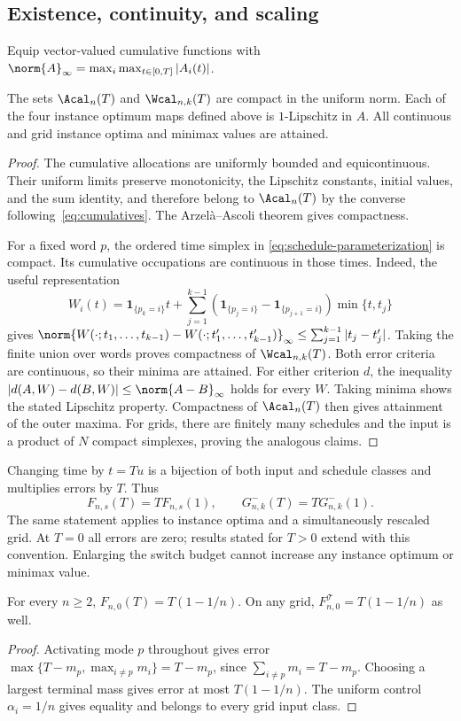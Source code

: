 \subsection{Existence, continuity, and scaling}

Equip vector-valued cumulative functions with
$\norm{A}_\infty=\max_i\max_{t\in[0,T]}|A_i(t)|$.
\begin{proposition}\label{prop:compactness}
The sets $\Acal_n(T)$ and $\Wcal_{n,k}(T)$ are compact in the uniform norm.
Each of the four instance optimum maps defined above is $1$-Lipschitz in
$A$. All continuous and grid instance optima and minimax values are attained.
\end{proposition}
\begin{proof}
The cumulative allocations are uniformly bounded and equicontinuous. Their
uniform limits preserve monotonicity, the Lipschitz constants, initial values,
and the sum identity, and therefore belong to $\Acal_n(T)$ by the converse
following~\eqref{eq:cumulatives}. The Arzel\`a--Ascoli theorem gives compactness.

For a fixed word $p$, the ordered time simplex in
\eqref{eq:schedule-parameterization} is compact. Its cumulative occupations
are continuous in those times. Indeed, the useful representation
\[
 W_i(t)=\mathbf1_{\{p_k=i\}}t+
 \sum_{j=1}^{k-1}
 (\mathbf1_{\{p_j=i\}}-\mathbf1_{\{p_{j+1}=i\}})\min\{t,t_j\}
\]
gives
$\norm{W(\cdot;t_1,\ldots,t_{k-1})-
W(\cdot;t'_1,\ldots,t'_{k-1})}_\infty
\le\sum_{j=1}^{k-1}|t_j-t'_j|$.
Taking the finite union over words proves compactness of
$\Wcal_{n,k}(T)$. Both error criteria are continuous, so their minima are
attained. For either criterion $d$, the inequality
$|d(A,W)-d(B,W)|\le\norm{A-B}_\infty$ holds for every $W$. Taking minima
shows the stated Lipschitz property. Compactness of $\Acal_n(T)$ then gives
attainment of the outer maxima. For grids, there are finitely many schedules
and the input is a product of $N$ compact simplexes, proving the analogous
claims.
\end{proof}

Changing time by $t=Tu$ is a bijection of both input and schedule classes and
multiplies errors by $T$. Thus
\begin{equation}\label{eq:scaling}
 F_{n,s}(T)=T F_{n,s}(1),\qquad G^-_{n,k}(T)=T G^-_{n,k}(1).
\end{equation}
The same statement applies to instance optima and a simultaneously rescaled
grid. At $T=0$ all errors are zero; results stated for $T>0$ extend with this
convention. Enlarging the switch budget cannot increase any instance optimum
or minimax value.

\begin{proposition}\label{prop:no-switch}
For every $n\ge2$,
$F_{n,0}(T)=T(1-1/n)$. On any grid,
$F^{\mathcal T}_{n,0}=T(1-1/n)$ as well.
\end{proposition}
\begin{proof}
Activating mode $p$ throughout gives error
$\max\{T-m_p,\max_{i\ne p}m_i\}=T-m_p$, since
$\sum_{i\ne p}m_i=T-m_p$. Choosing a largest terminal mass gives error at
most $T(1-1/n)$. The uniform control $\alpha_i=1/n$ gives equality and
belongs to every grid input class.
\end{proof}
